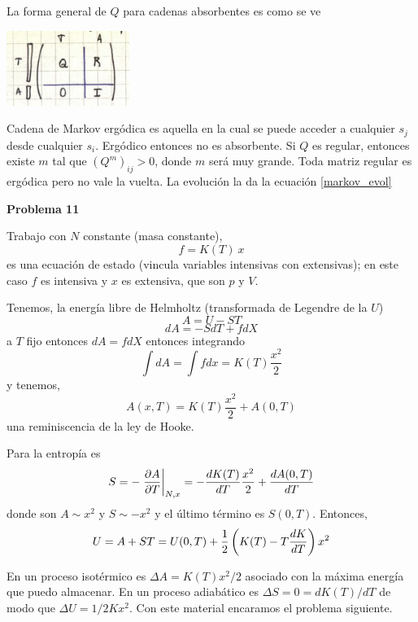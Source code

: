 \documentclass[10pt,oneside]{CBFT_book}
\begin{document}
La forma general de $Q$ para cadenas absorbentes es como se ve

\includegraphics[width=0.30\textwidth]{images/1606329205.jpg}

Cadena de Markov ergódica es aquella en la cual se puede acceder a cualquier $s_j$ desde cualquier $s_i$.
Ergódico entonces no es absorbente.
Si $Q$ es regular, entonces existe $m$ tal que $(Q^m)_{ij} > 0$, donde $m$ será muy grande.
Toda matriz regular es ergódica pero no vale la vuelta. La evolución la da la ecuación \eqref{markov_evol}

\begin{ejemplo}{\bf Problema 11}

Trabajo con $N$ constante (masa constante),
\[
	f = K(T) \: x
\]
es una ecuación de estado (vincula variables intensivas con extensivas); en este caso $f$ es intensiva
y $x$ es extensiva, que son $p$ y $V$.

Tenemos, la energía libre de Helmholtz (transformada de Legendre de la $U$)
\[
	A = U -S T
\]
\[
	dA = - S dT + f dX
\]
a $T$ fijo entonces $dA = f dX$ entonces integrando
\[
	\int dA = \int f dx = K(T) \frac{x^2}{2}
\]
y tenemos,
\[
	A(x,T) = K(T) \frac{x^2}{2} + A(0,T)
\]
una reminiscencia de la ley de Hooke.

Para la entropía es 
\[
	S = - \left.\frac{\partial^{\hspace{-0.05em}} {A}}{\partial {T}^{\hspace{-0.05em}}}\right|_{N,x} = - \frac{d^{\hspace{-0.05em}} {K(T)}}{d {T}^{\hspace{-0.05em}}} \frac{x^2}{2} + \frac{d^{\hspace{-0.05em}} {A(0,T)}}{d {T}^{\hspace{-0.05em}}}
\]
donde son $A \sim x^2$ y $S \sim -x^2$ y el último término es $S(0,T)$.
Entonces,
\[
	U = A + S T = U(0,T) + \frac{1}{2}\left( K(T) - T \frac{d^{\hspace{-0.05em}} {K}}{d {T}^{\hspace{-0.05em}}} \right) x^2
\]

En un proceso isotérmico es $\Delta A = K(T) x^2/2$ asociado con la máxima energía que  puedo
almacenar.
En un proceso adiabático es $\Delta S = 0 = dK(T)/dT$ de modo que $\Delta U = 1/2 K x^2$.
Con este material encaramos el problema siguiente.
 
\end{ejemplo}
\end{document}
